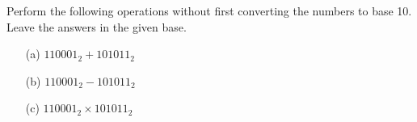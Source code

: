 Perform the following operations without first converting the numbers to base
10.
Leave the answers in the given base.
\begin{enumerate}[nosep]
\item[(a)] $110001_2 + 101011_2$	
\item[(b)] $110001_2 - 101011_2$	
\item[(c)] $110001_2 \times 101011_2$
\end{enumerate}
